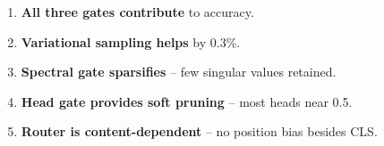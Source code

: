 \begin{enumerate}
\item \textbf{All three gates contribute} to accuracy.
\item \textbf{Variational sampling helps} by 0.3\%.
\item \textbf{Spectral gate sparsifies} -- few singular values retained.
\item \textbf{Head gate provides soft pruning} -- most heads near 0.5.
\item \textbf{Router is content-dependent} -- no position bias besides CLS.

\end{enumerate}
